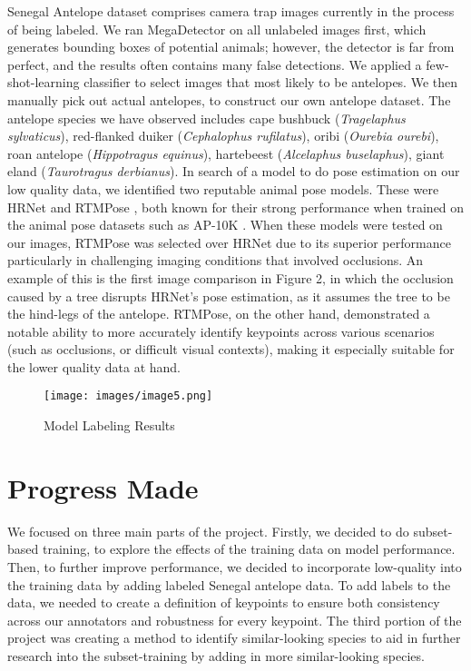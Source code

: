 \documentclass[conference]{IEEEtran}
\begin{document}
Senegal Antelope dataset comprises camera trap images currently in the process of being labeled.
We ran MegaDetector\cite{beery2019efficient} on all unlabeled images first, which generates bounding boxes of potential animals;
however, the detector is far from perfect, and the results often contains many false detections.
We applied a few-shot-learning classifier\cite{AI-FSL} to select images that most likely to be antelopes.
We then manually pick out actual antelopes, to construct our own antelope dataset.
The antelope species we have observed includes cape bushbuck (\textit{Tragelaphus sylvaticus}), red-flanked duiker (\textit{Cephalophus rufilatus}), oribi (\textit{Ourebia ourebi}), roan antelope (\textit{Hippotragus equinus}), hartebeest (\textit{Alcelaphus buselaphus}), giant eland (\textit{Taurotragus derbianus}). %
In search of a model to do pose estimation on our low quality data, we identified two reputable animal pose models.
These were HRNet \cite{HRNet} and RTMPose \cite{rtmpose}, both known for their strong performance when trained on the animal pose datasets such as AP-10K \cite{AP10K}.
When these models were tested on our images, RTMPose \cite{rtmpose} was selected over HRNet \cite{HRNet} due to its superior performance particularly in challenging imaging conditions that involved occlusions. An example of this is the first image comparison in Figure 2, in which the occlusion caused by a tree disrupts HRNet's \cite{HRNet} pose estimation, as it assumes the tree to be the hind-legs of the antelope. RTMPose\cite{rtmpose}, on the other hand, demonstrated a notable ability to more accurately identify keypoints across various scenarios (such as occlusions, or difficult visual contexts), making it especially suitable for the lower quality data at hand. 

\begin{figure}[htbp]
    \centerline{\texttt{[image: images/image5.png]}}
    \caption{Model Labeling Results}
    \label{fig:example}
\end{figure}

\section{Progress Made}
We focused on three main parts of the project.
Firstly, we decided to do subset-based training, to explore the effects of the training data on model performance.
Then, to further improve performance, we decided to incorporate low-quality into the training data by adding labeled Senegal antelope data.
To add labels to the data, we needed to create a definition of keypoints to ensure both consistency across our annotators and robustness for every keypoint.
The third portion of the project was creating a method to identify similar-looking species to aid in further research into the subset-training by adding in more similar-looking species.
\end{document}
